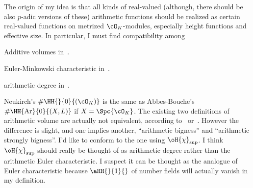 \documentclass[a4paper, twoside]{article}
\begin{document}




The origin of my idea is that all kinds of real-valued (although, there should be also $p$-adic versions of these) arithmetic functions should be realized as certain real-valued functions on metrized $\cO_{K}$-modules, especially height functions and effective size. In particular, I must find compatibility among
\begin{enr}
	\item Additive volumes in~\cite{AB1995}.
	\item Euler-Minkowski characteristic in~\cite{Neukirch1999}.
	\item arithmetic degree in~\cite{GS1990Arithmetic}.
\end{enr}
 Neukirch's $\#\HH{}{0}{(\cO_{K})}$ is the same as Abbes-Bouche's $\#\HH{\mathrm{Ar}}{0}{(X,L)}$ if $X=\Spc{\cO_{K}}$.
 The existing two definitions of arithmetic volume are actually not equivalent, according to~\cite[Page~368]{Chen2011} or~\cite[Page~613]{Yuan2008Big}. However the difference is slight, and one implies another, ``arithmetic bigness'' and ``arithmetic strongly bigness''. I'd like to conform to the one using $\oH{\chi}_{\mathrm{sup}}$.
 I think $\oH{\chi}_{\mathrm{sup}}$ should really be thought of as arithmetic degree rather than the arithmetic Euler characteristic. I suspect it can be thought as the analogue of Euler characteristic because $\aHH{}{1}{}$ of number fields will actually vanish in my definition.
\end{document}
